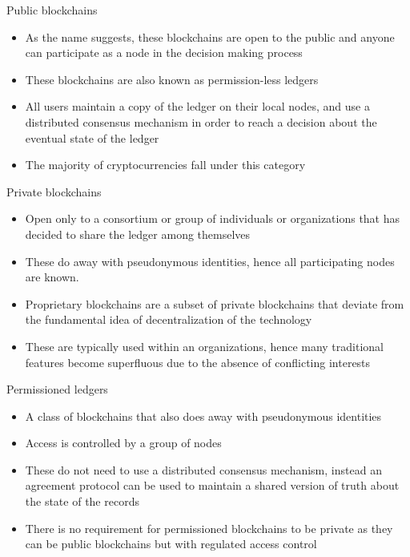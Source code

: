 \documentclass[10pt]{beamer}
\begin{document}
\begin{frame}{Public blockchains}
	\begin{itemize}
		\item As the name suggests, these blockchains are open to the public and anyone can participate as a node in the decision making process
		\item These blockchains are also known as permission-less ledgers
		\item All users maintain a copy of the ledger on their local nodes, and use a distributed consensus mechanism in order to reach a decision about the eventual state of the ledger
		\item The majority of cryptocurrencies fall under this category
	\end{itemize}
\end{frame}


\begin{frame}{Private blockchains}
	\begin{itemize}
		\item Open only to a consortium or group of individuals or organizations that has decided to share the ledger among themselves
		\item These do away with pseudonymous identities, hence all participating nodes are known.
		\item Proprietary blockchains are a subset of private blockchains that deviate from the fundamental idea of decentralization of the technology
		\item These are typically used within an organizations, hence many traditional features become superfluous due to the absence of conflicting interests
	\end{itemize}
\end{frame}


\begin{frame}{Permissioned ledgers}
	\begin{itemize}
		\item A class of blockchains that also does away with pseudonymous identities
		\item Access is controlled by a group of nodes
		\item These do not need to use a distributed consensus mechanism, instead an agreement protocol can be used to maintain a shared version of truth about the state of the records
		\item There is no requirement for permissioned blockchains to be private as they can be public blockchains but with regulated access control
	\end{itemize}
\end{frame}
\end{document}
